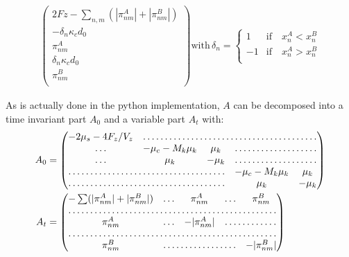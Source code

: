 \documentclass[a4paper,12pt]{article}
\begin{document}
\begin{equation}
\begin{aligned}
    \begin{pmatrix}
      2Fz - \sum_{n,m}(|\pi_{nm}^A| + |\pi_{nm}^B|) \\
      - \delta_n \kappa_c d_0\\
      \pi_{nm}^A\\
      \delta_n \kappa_c d_0\\
      \pi_{nm}^B\\
    \end{pmatrix}
    \mathrm{with}\, \delta_n =%
    \begin{cases}
      1  &\mathrm{if}\quad  x_n^A < x_n^B\\
      -1 &\mathrm{if}\quad  x_n^A > x_n^B\\
    \end{cases}
\end{aligned}
\end{equation}

As is actually done in the python implementation, 
$A$  can be decomposed into a time invariant part $A_0$ and a
variable part $A_t$ with:\\
\begin{equation}
  \begin{aligned}
    A_0 &=%
    \begin{pmatrix}
      - 2 \mu_s - 4 F_z/V_z & \hdotsfor{4}\\
      \hdots &  -\mu_c - M_k \mu_k& \mu_k & \hdotsfor{2}\\
      \hdots & \mu_k & - \mu_k & \hdotsfor{2}\\
      \hdotsfor{3} & -\mu_c - M_k \mu_k & \mu_k\\
      \hdotsfor{3} & \mu_k & - \mu_k\\
    \end{pmatrix}\\
    A_t &=%
    \begin{pmatrix}
      - \sum (|\pi_{nm}^A| + |\pi_{nm}^B|)& \hdots & \pi_{nm}^A &%
      \hdots &  \pi_{nm}^B\\
      \hdotsfor{5}\\
      \pi_{nm}^A & \hdots & - |\pi_{nm}^A| & \hdotsfor{2}\\
      \hdotsfor{5}\\
      \pi_{nm}^B & \hdotsfor{3} & - |\pi_{nm}^B| \\
    \end{pmatrix}\\
  \end{aligned}
\end{equation}
\end{document}
